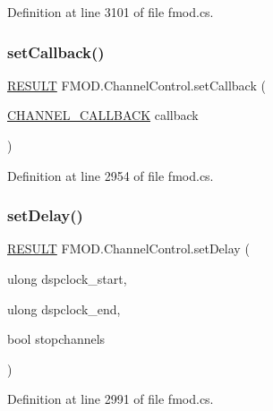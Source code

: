 Definition at line 3101 of file fmod.\+cs.

\mbox{\label{class_f_m_o_d_1_1_channel_control_a675ef7e3017ad231e4f83f509a3f5166}} 
\subsubsection{\texorpdfstring{set\+Callback()}{setCallback()}}
{\footnotesize\ttfamily \hyperlink{namespace_f_m_o_d_a305d1176ef3f8c8815861a60407ac33d}{R\+E\+S\+U\+LT} F\+M\+O\+D.\+Channel\+Control.\+set\+Callback (\begin{DoxyParamCaption}\item[{\hyperlink{namespace_f_m_o_d_a3094c885d2c4a21049c65cb016a4cd3e}{C\+H\+A\+N\+N\+E\+L\+\_\+\+C\+A\+L\+L\+B\+A\+CK}}]{callback }\end{DoxyParamCaption})}



Definition at line 2954 of file fmod.\+cs.

\mbox{\label{class_f_m_o_d_1_1_channel_control_a054876159fc34717895c242e70232faf}} 
\subsubsection{\texorpdfstring{set\+Delay()}{setDelay()}}
{\footnotesize\ttfamily \hyperlink{namespace_f_m_o_d_a305d1176ef3f8c8815861a60407ac33d}{R\+E\+S\+U\+LT} F\+M\+O\+D.\+Channel\+Control.\+set\+Delay (\begin{DoxyParamCaption}\item[{ulong}]{dspclock\+\_\+start,  }\item[{ulong}]{dspclock\+\_\+end,  }\item[{bool}]{stopchannels }\end{DoxyParamCaption})}



Definition at line 2991 of file fmod.\+cs.

\mbox{\label{class_f_m_o_d_1_1_channel_control_a90bc0f80cc8890cad1ebb058814e7732}} 
